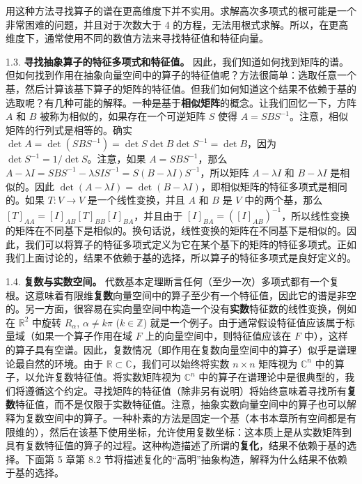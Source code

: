 用这种方法寻找算子的谱在更高维度下并不实用。求解高次多项式的根可能是一个非常困难的问题，并且对于次数大于 4 的方程，无法用根式求解。所以，在更高维度下，通常使用不同的数值方法来寻找特征值和特征向量。

1.3. \textbf{寻找抽象算子的特征多项式和特征值。} 因此，我们知道如何找到矩阵的谱。但如何找到作用在抽象向量空间中的算子的特征值呢？方法很简单：选取任意一个基，然后计算该基下算子的矩阵的特征值。但我们如何知道这个结果不依赖于基的选取呢？有几种可能的解释。一种是基于\textbf{相似矩阵}的概念。让我们回忆一下，方阵 $A$ 和 $B$ 被称为相似的，如果存在一个可逆矩阵 $S$ 使得 $A = SBS^{-1}$。注意，相似矩阵的行列式是相等的。确实 $\det A = \det(SBS^{-1}) = \det S \det B \det S^{-1} = \det B$，因为 $\det S^{-1} = 1/\det S$。注意，如果 $A = SBS^{-1}$，那么 $A - \lambda I = SBS^{-1} - \lambda SIS^{-1} = S(B - \lambda I)S^{-1}$，所以矩阵 $A - \lambda I$ 和 $B - \lambda I$ 是相似的。因此 $\det(A - \lambda I) = \det(B - \lambda I)$，即相似矩阵的特征多项式是相同的。如果 $T: V \to V$ 是一个线性变换，并且 $A$ 和 $B$ 是 $V$ 中的两个基，那么 $[T]_{AA} = [I]_{AB}[T]_{BB}[I]_{BA}$，并且由于 $[I]_{BA} = ([I]_{AB})^{-1}$，所以线性变换的矩阵在不同基下是相似的。换句话说，线性变换的矩阵在不同基下是相似的。因此，我们可以将算子的特征多项式定义为它在某个基下的矩阵的特征多项式。正如我们上面讨论的，结果不依赖于基的选择，所以算子的特征多项式是良好定义的。

1.4. \textbf{复数与实数空间。} 代数基本定理断言任何（至少一次）多项式都有一个复根。这意味着有限维\textbf{复数}向量空间中的算子至少有一个特征值，因此它的谱是非空的。另一方面，很容易在实向量空间中构造一个没有\textbf{实数}特征数的线性变换，例如在 $\mathbb{R}^2$ 中旋转 $R_\alpha$, $\alpha \neq k\pi$ ($k \in \mathbb{Z}$) 就是一个例子。由于通常假设特征值应该属于标量域（如果一个算子作用在域 $F$ 上的向量空间中，则特征值应该在 $F$ 中），这样的算子具有空谱。因此，复数情况（即作用在复数向量空间中的算子）似乎是谱理论最自然的环境。由于 $\mathbb{R} \subset \mathbb{C}$，我们可以始终将实数 $n \times n$ 矩阵视为 $\mathbb{C}^n$ 中的算子，以允许复数特征值。将实数矩阵视为 $\mathbb{C}^n$ 中的算子在谱理论中是很典型的，我们将遵循这个约定。寻找矩阵的特征值（除非另有说明）将始终意味着寻找所有\textbf{复数}特征值，而不是仅限于实数特征值。注意，抽象实数向量空间中的算子也可以解释为复数空间中的算子。一种朴素的方法是固定一个基（本书本章所有空间都是有限维的），然后在该基下使用坐标，允许使用复数坐标：这本质上是从实数矩阵到具有复数特征值的算子的过程。这种构造描述了所谓的\textbf{复化}，结果不依赖于基的选择。下面第 5 章第 8.2 节将描述复化的“高明”抽象构造，解释为什么结果不依赖于基的选择。

